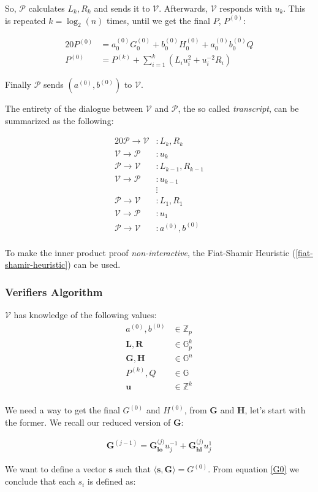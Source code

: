 \documentclass{article}
\newcommand{\eq}[1]{\begin{alignat*}{20}#1\end{alignat*}}
\newcommand{\eqn}[2]{\begin{equation}\label{#1}\begin{split}#2\end{split}\end{equation}}
\renewcommand{\vec}[1]{\boldsymbol{#1}}
\newcommand{\V}{\mathcal{V}}
\renewcommand{\P}{\mathcal{P}}
\newcommand{\G}{\mathbb{G}}
\newcommand{\Z}{\mathbb{Z}}
\newcommand{\dotp}[2]{\langle #1, #2 \rangle}
\newcommand{\opn}[1]{\operatorname{#1}}
\newcommand{\veclo}[1]{\vec{#1_{\opn{lo}}}}
\newcommand{\vechi}[1]{\vec{#1_{\opn{hi}}}}
\begin{document}
So, $\P$ calculates $L_k, R_k$ and sends it to $\V$. Afterwards,
$\V$ responds with $u_k$. This is repeated $k = \log_2(n)$ times,
until we get the final $P$, $P^{(0)}$:

\eq{
	P^{(0)} &= a^{(0)}_0 G^{(0)}_0 + b^{(0)}_0 H^{(0)}_0 + a^{(0)}_0 b^{(0)}_0 Q \\
	P^{(0)} &= P^{(k)} + \sum^k_{i=1}(L_i u^2_i + u^{-2}_i R_i)
}

Finally $\P$ sends $(a^{(0)}, b^{(0)})$ to $\V$.

The entirety of the dialogue between $\V$ and $\P$,
the so called \textit{transcript}, can be summarized as the following:

\eq{
	\P \rightarrow \V &: L_k, R_k \\
	\V \rightarrow \P &: u_k \\[5pt]
	\P \rightarrow \V &: L_{k-1}, R_{k-1} \\
	\V \rightarrow \P &: u_{k-1} \\[-5pt]
	                  &\vdots \\
	\P \rightarrow \V &: L_{1}, R_{1} \\
	\V \rightarrow \P &: u_{1} \\[5pt]
	\P \rightarrow \V &: a^{(0)}, b^{(0)} \\
}

To make the inner product proof \textit{non-interactive}, the
Fiat-Shamir Heuristic (\ref{fiat-shamir-heuristic}) can be used.

\subsubsection{Verifiers Algorithm}
$\V$ has knowledge of the following values:
\eqn{def1-ver}{
	a^{(0)}, b^{(0)} &\in \Z_p \\
	\vec{L}, \vec{R} &\in \G_p^{k} \\
	\vec{G}, \vec{H} &\in \G^n \\
	P^{(k)}, Q &\in \G \\
	\vec{u} &\in \Z^{k} \\
}

We need a way to get the final $G^{(0)}$ and $H^{(0)}$, from $\vec{G}$
and $\vec{H}$, let's start with the former. We recall our reduced
version of $\vec{G}$:

\eqn{G0}{
	\vec{G}^{(j-1)} = \veclo{G^\textit{(j)}} u^{-1}_j + \vechi{G^\textit{(j)}} u^{1}_j
}

We want to define a vector $\vec{s}$ such that $\dotp{\vec{s}}{\vec{G}}
= G^{(0)}$. From equation \ref{G0} we conclude that each $s_i$ is
defined as:
\end{document}
